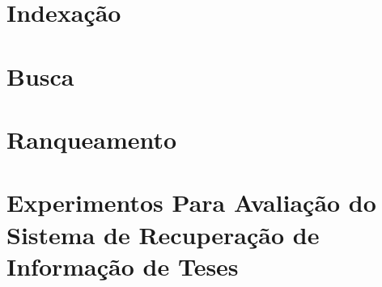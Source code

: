 \documentclass[
	12pt,				%
	openright,			%
	oneside,			%
	a4paper,			%
	english,			%
	french,				%
	spanish,			%
	brazil				%
	]{abntex2}
\begin{document}
\section{Indexação}\label{sec:indexacao}
%


\section{Busca}\label{sec:busca}

\section{Ranqueamento}\label{sec:ranqueamento}

\section{Experimentos Para Avaliação do Sistema de Recuperação de Informação de Teses}\label{sec:experimentos-para-avaliacao-do-sistema-de-recuperacao-de-informacao-de-teses}
\end{document}
